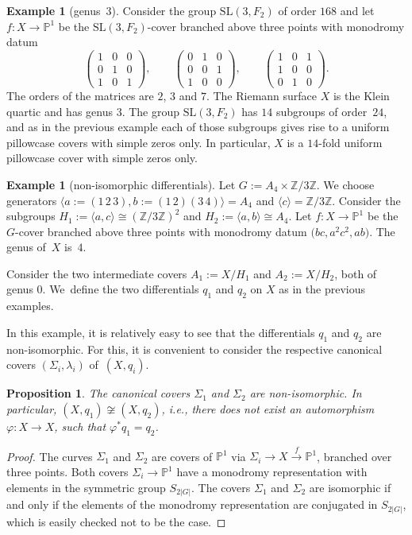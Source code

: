 \documentclass[10pt,a4paper]{amsart}
\numberwithin{equation}{section}
\newtheorem{prop}[theo]{Proposition}
\theoremstyle{definition}
\newtheorem{exam}[theo]{Example}
\renewcommand{\to}{\rightarrow}
\newcommand{\ZZ}{\mathbb{Z}}
\newcommand{\PP}{\mathbb{P}}
\newcommand{\SL}{\mathrm{SL}}
\begin{document}
\begin{exam}[genus~3]
Consider the group $\SL(3,F_2)$ of order $168$ and let $f\colon X\to\PP^1$ be the $\SL(3,F_2)$-cover branched above three points with monodromy datum
\[
	\begin{pmatrix}1&0&0\\0&1&0\\1&0&1\end{pmatrix}, \qquad
	\begin{pmatrix}0&1&0\\0&0&1\\1&0&0\end{pmatrix}, \qquad
	\begin{pmatrix}1&0&1\\1&0&0\\0&1&0\end{pmatrix}.
\]
The orders of the matrices are $2$, $3$ and $7$. The Riemann surface $X$ is the Klein quartic and has genus $3$.
The group $\SL(3,F_2)$ has $14$ subgroups of order~$24$, and as in the previous example each of those subgroups gives rise to a uniform pillowcase covers with simple zeros only.
In particular, $X$ is a $14$-fold uniform pillowcase cover with simple zeros only.
\end{exam}

\begin{exam}[non-isomorphic differentials]\label{exam:bifold_nonisom}
Let $G := A_4 \times \ZZ/3\ZZ$.
We choose generators $\langle a:= (1\, 2\, 3), b:=(1\, 2)(3\, 4) \rangle = A_4$ and $\langle c \rangle = \ZZ/3\ZZ$.
Consider the subgroups $H_1 := \langle a, c \rangle \cong (\ZZ/3\ZZ)^2$
and $H_2 := \langle a, b \rangle \cong A_4$.
Let $f\colon X \to \PP^1$ be the $G$-cover branched above three points with monodromy datum $\bigl(bc, a^2c^2, ab\bigr)$.
The genus of~$X$ is~$4$.

Consider the two intermediate covers $A_1 := X/H_1$ and $A_2 := X/H_2$, both of genus $0$.
We~define the two differentials $q_1$ and $q_2$ on $X$ as in the previous examples.

In this example, it is relatively easy to see that the differentials $q_1$ and $q_2$ are non-isomorphic.
For this, it is convenient to consider the respective canonical covers $(\Sigma_i, \lambda_i)$ of~$(X, q_i)$.
\end{exam}
\begin{prop}\label{prop:non-isomorphic_pillow}
	The canonical covers $\Sigma_1$ and $\Sigma_2$ are non-isomorphic.
	In particular, $(X,q_1) \not \cong (X,q_2)$, i.e., there does not exist an automorphism $\varphi\colon X \to X$, such that $\varphi^* q_1 = q_2$.
\end{prop}
\begin{proof}
	The curves $\Sigma_1$ and $\Sigma_2$ are covers of $\PP^1$ via $\Sigma_i \to X \xrightarrow{f} \PP^1$, branched over three points.
	Both covers $\Sigma_i \to \PP^1$ have a monodromy representation with elements in the symmetric group $S_{2|G|}$.
	The covers $\Sigma_1$ and $\Sigma_2$ are isomorphic if and only if the elements of the monodromy representation are conjugated in $S_{2|G|}$, which is easily checked not to be the case.
\end{proof}
\end{document}
